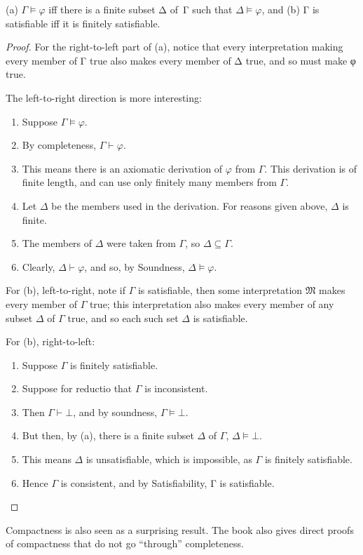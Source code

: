 \documentclass[12pt]{report}
\theoremstyle{nonumberplain}
\newtheorem{proof}{Proof}
\newcommand{\M}{\mathfrak{M}}
\begin{document}
\begin{coro}[Compactness]
(a) $Γ ⊨ φ$ iff there is a finite subset Δ of \,Γ such that $Δ ⊨ φ$, and (b) Γ is satisfiable iff it is finitely satisfiable.
\end{coro}
\begin{proof}
For the right-to-left part of (a), notice that every interpretation making every member of Γ true also makes every member of Δ true, and so must make φ true.

The left-to-right direction is more interesting:

\begin{enumerate}
\item Suppose  $Γ ⊨ φ$.
\item By completeness, $Γ ⊢ φ$.
\item This means there is an axiomatic derivation of $φ$ from $Γ$. This derivation is of finite length, and can use only finitely many members from $Γ$.
\item Let $Δ$ be the members used in the derivation. For reasons given above, $Δ$ is finite.
\item The members of $Δ$ were taken from $Γ$, so $Δ ⊆ Γ$.
\item Clearly, $Δ ⊢ φ$, and so, by Soundness, $Δ ⊨ φ$.
\end{enumerate}

For (b), left-to-right, note if $Γ$ is satisfiable, then some interpretation $\M$ makes every member of $Γ$ true; this interpretation also makes every member of any subset $Δ$ of $Γ$ true, and so each such set $Δ$ is satisfiable.

For (b), right-to-left:
\begin{enumerate}
\item Suppose $Γ$ is finitely satisfiable.
\item Suppose for reductio that $Γ$ is inconsistent.
\item Then $Γ ⊢ ⊥$, and by soundness, $Γ ⊨ ⊥$.
\item But then, by (a), there is a finite subset $Δ$ of $Γ$, $Δ ⊨ ⊥$.
\item This means $Δ$ is unsatisfiable, which is impossible, as $Γ$ is finitely satisfiable.
\item Hence $Γ$ is consistent, and by Satisfiability, Γ is satisfiable.
\end{enumerate}
\end{proof}

\noindent Compactness is also seen as a surprising result. The book also gives direct proofs of compactness that do not go ``through'' completeness.
\end{document}

